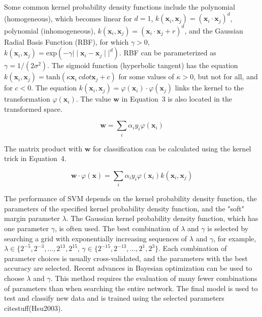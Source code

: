 \documentclass[preprint,12pt]{elsarticle}
\begin{document}
Some common kernel probability density functions include the polynomial (homogeneous), which becomes linear for $d=1$, $k(\mathbf{x}_{i}, \mathbf{x}_{j}) = {(\mathbf{x}_{i} \cdot \mathbf{x}_{j})}^{d}$, polynomial (inhomogeneous), $k(\mathbf{x}_{i}, \mathbf{x}_{j}) = {(\mathbf{x}_{i} \cdot \mathbf{x}_{j} + r)}^{d}$, and the Gaussian Radial Basis Function (RBF), for which $\gamma > 0$, $k(\mathbf{x}_{i}, \mathbf{x}_{j}) = \mathrm{exp}(- \gamma{\mid \mid \mathbf{x}_{i} - \mathbf{x}_{j} \mid \mid}^{d})$. RBF can be parameterized as $\gamma = 1 / (2{\sigma}^{2})$. The sigmoid function (hyperbolic tangent) has the equation $k(\mathbf{x}_{i}, \mathbf{x}_{j}) = \mathrm{tanh}(\kappa \mathbf{x}_{i} \ cdot \mathbf{x}_{j} + c)$ for some values of $\kappa > 0$, but not for all, and for $c < 0$. The equation $k(\mathbf{x}_{i}, \mathbf{x}_{j}) = \varphi(\mathbf{x}_{i}) \cdot \varphi(\mathbf{x}_{j})$ links the kernel to the transformation $\varphi(\mathbf{x}_{i})$. The value $\mathbf{w}$ in Equation~3 is also located in the transformed space.

\begin{equation}
	\mathbf{w} = \sum_{i} \alpha_{i}y_{i}\varphi(\mathbf{x}_{i} )
	\label{eqn:3}
\end{equation}

The matrix product with $\mathbf{w}$ for classification can be calculated using the kernel trick in Equation~4.

\begin{equation}
	\mathbf{w} \cdot \varphi(\mathbf{x}) = \sum_{i} \alpha_{i}y_{i}\varphi (\mathbf{x}_{i}) k(\mathbf{x}_{i}, \mathbf{x}_{j})
	\label{eqn:4}
\end{equation}

The performance of SVM depends on the kernel probability density function, the parameters of the specified kernel probability density function, and the "soft" margin parameter $\lambda$. The Gaussian kernel probability density function, which has one parameter $\gamma$, is often used. The best combination of $\lambda$ and $\gamma$ is selected by searching a grid with exponentially increasing sequences of $\lambda$ and $\gamma$, for example, $\lambda \in \{2^{-5},2^{-3},\dots,2^{13},2^{15}$, $\gamma \in \{2^{-15},2^{-13},\dots,2^{1}, 2^{3}\}$. Each combination of parameter choices is usually cross-validated, and the parameters with the best accuracy are selected. Recent advances in Bayesian optimization can be used to choose $\lambda$ and $\gamma$. This method requires the evaluation of many fewer combinations of parameters than when searching the entire network. The final model is used to test and classify new data and is trained using the selected parameters citestuff(Hsu2003).
\end{document}
